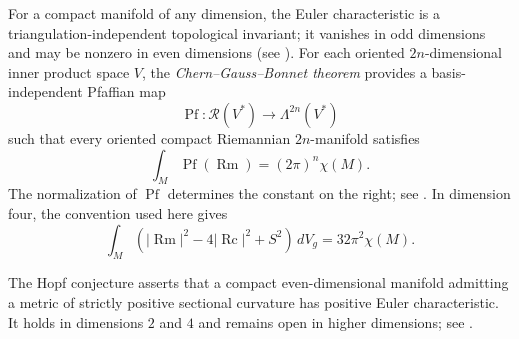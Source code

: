 For a compact manifold of any dimension, the Euler characteristic is a
triangulation-independent topological invariant; it vanishes in odd dimensions
and may be nonzero in even dimensions (see \cite[Thm. 13.36]{LeeTM}). For each
oriented $2n$-dimensional inner product space $V$, the
\emph{Chern--Gauss--Bonnet theorem} provides a basis-independent Pfaffian map
\[
\operatorname{Pf}\colon\mathcal R(V^*)\longrightarrow\Lambda^{2n}(V^*)
\]
such that every oriented compact Riemannian $2n$-manifold satisfies
\[
\int_M\operatorname{Pf}(\operatorname{Rm})=(2\pi)^n\chi(M).
\]
The normalization of $\operatorname{Pf}$ determines the constant on the right;
see \cite[Vol. 5]{Spi79}. In dimension four, the convention used here gives
\begin{equation}
\int_M\left(
|\operatorname{Rm}|^2-4|\operatorname{Rc}|^2+S^2
\right)\,dV_g
=32\pi^2\chi(M).
\label{eq:chern-gauss-bonnet-4d}
\tag{9.14}
\end{equation}

The Hopf conjecture asserts that a compact even-dimensional manifold admitting
a metric of strictly positive sectional curvature has positive Euler
characteristic. It holds in dimensions $2$ and $4$ and remains open in higher
dimensions; see \cite[p. 320]{Pet16}.
